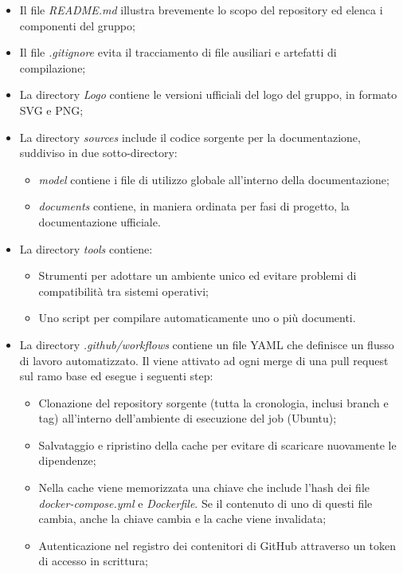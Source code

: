 \begin{itemize}
  \item Il file \emph{README.md} illustra brevemente lo scopo del repository ed elenca i componenti del gruppo;
  \item Il file \emph{.gitignore} evita il tracciamento di file ausiliari e artefatti di compilazione;
  \item La directory \emph{Logo} contiene le versioni ufficiali del logo del gruppo, in formato SVG e PNG;
  \item La directory \emph{sources} include il codice sorgente per la documentazione, suddiviso in due sotto-directory:
  \begin{itemize}
    \item \emph{model} contiene i file di utilizzo globale all'interno della documentazione;
    \item \emph{documents} contiene, in maniera ordinata per fasi di progetto, la documentazione ufficiale.
  \end{itemize}
  \item La directory \emph{tools} contiene:
  \begin{itemize}
    \item Strumenti  per adottare un ambiente unico ed evitare problemi di compatibilità tra sistemi operativi;
    \item Uno script per compilare automaticamente uno o più documenti.
  \end{itemize}
  \item La directory \emph{.github/workflows} contiene un file YAML che definisce un flusso di lavoro automatizzato. Il  viene attivato ad ogni merge di una pull request sul ramo base ed esegue i seguenti step:
  \begin{itemize}
    \item Clonazione del repository sorgente (tutta la cronologia, inclusi branch e tag) all'interno dell'ambiente di esecuzione del job (Ubuntu);
    \item Salvataggio e ripristino della cache per evitare di scaricare nuovamente le dipendenze;
    \item Nella cache viene memorizzata una chiave che include l'hash dei file \emph{docker-compose.yml} e \emph{Dockerfile}. Se il contenuto di uno di questi file cambia, anche la chiave cambia e la cache viene invalidata;
    \item Autenticazione nel registro dei contenitori di GitHub attraverso un token di accesso in scrittura;

\end{itemize}
\end{itemize}
